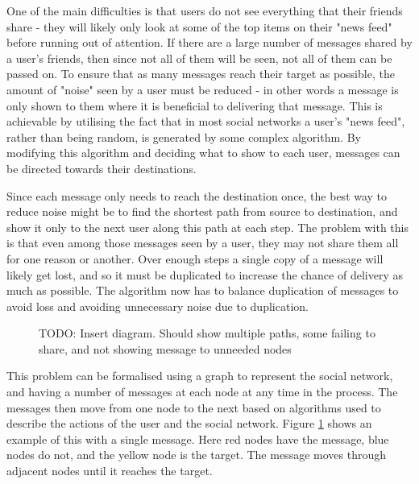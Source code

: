\documentclass[bsc,frontabs,twoside,singlespacing,parskip,deptreport]{infthesis}     %
\begin{document}
One of the main difficulties is that users do not see everything that their friends share - they will likely only look at some of the top items on their "news feed" before running out of attention. If there are a large number of messages shared by a user's friends, then since not all of them will be seen, not all of them can be passed on. To ensure that as many messages reach their target as possible, the amount of "noise" seen by a user must be reduced - in other words a message is only shown to them where it is beneficial to delivering that message. This is achievable by utilising the fact that in most social networks a user's "news feed", rather than being random, is generated by some complex algorithm. By modifying this algorithm and deciding what to show to each user, messages can be directed towards their destinations.

Since each message only needs to reach the destination once, the best way to reduce noise might be to find the shortest path from source to destination, and show it only to the next user along this path at each step. The problem with this is that even among those messages seen by a user, they may not share them all for one reason or another. Over enough steps a single copy of a message will likely get lost, and so it must be duplicated to increase the chance of delivery as much as possible. The algorithm now has to balance duplication of messages to avoid loss and avoiding unnecessary noise due to duplication.

\begin{figure}
\begin{tikzpicture}
\end{tikzpicture}
\begin{tikzpicture}
\end{tikzpicture}
\caption{TODO: Insert diagram. Should show multiple paths, some failing to share, and not showing message to unneeded nodes}
\label{fig:intro_example}
\end{figure}

This problem can be formalised using a graph to represent the social network, and having a number of messages at each node at any time in the process. The messages then move from one node to the next based on algorithms used to describe the actions of the user and the social network. Figure \ref{fig:intro_example} shows an example of this with a single message. Here red nodes have the message, blue nodes do not, and the yellow node is the target. The message moves through adjacent nodes until it reaches the target.
\end{document}
